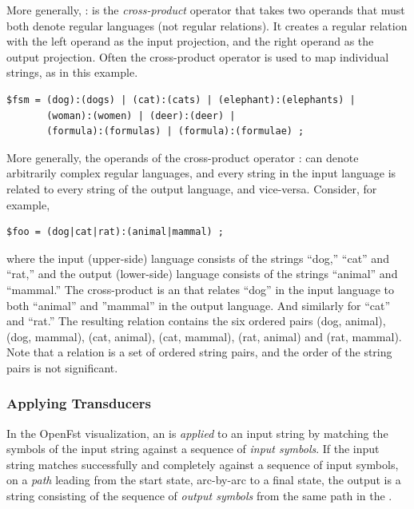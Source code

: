 \noindent
More generally, : is the \emph{cross-product} operator that takes two operands that must
both denote regular languages (not regular relations).  It creates a regular relation with the
left operand as the input projection, and the right operand as the output projection.
Often the cross-product operator is used to map
individual strings, as in this example.


\begin{Verbatim}
$fsm = (dog):(dogs) | (cat):(cats) | (elephant):(elephants) |
       (woman):(women) | (deer):(deer) |
       (formula):(formulas) | (formula):(formulae) ;
\end{Verbatim}


More generally, the operands of the cross-product operator : can denote arbitrarily complex regular languages, 
and every string in the input language is related to every string of the
output language, and vice-versa.  Consider, for example,

\begin{Verbatim}
$foo = (dog|cat|rat):(animal|mammal) ;
\end{Verbatim}

\noindent
where the input (upper-side) language consists of the strings ``dog,'' ``cat'' and ``rat,'' and the output (lower-side)
language consists of the strings ``animal'' and ``mammal.''  The cross-product is an \fst{} that
relates ``dog'' in the input language to both ``animal'' and ''mammal'' in the output
language.  And similarly for ``cat'' and ``rat.''  The resulting relation
contains the six ordered pairs (dog, animal), (dog, mammal), (cat, animal), (cat,
mammal), (rat, animal) and (rat, mammal).  Note that a relation is a set of ordered string
pairs, and the order of the string pairs is not significant.

\subsubsection{Applying Transducers}

In the OpenFst visualization, an \fst{} is \emph{applied} to an input string by
matching the symbols of the input string against a sequence of \emph{input symbols}.  If the input string matches successfully
and completely against a sequence of input symbols, on a \emph{path} leading from the start state,
arc-by-arc to a final state, 
the output is a string consisting of the sequence of \emph{output symbols} from the same path 
in the \fst{}.  

